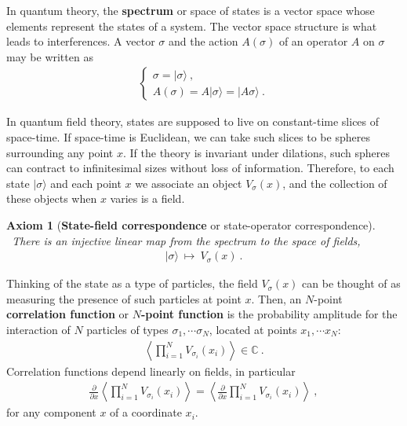\documentclass[12pt, a4paper, notitlepage, twoside]{report}
\numberwithin{equation}{section}
\theoremstyle{break}
\newtheorem{hyp}{Axiom}[chapter]
\begin{document}
In quantum theory, the \textbf{\boldmath spectrum} or space of states is a vector space whose elements represent the states of a system.
The vector space structure is what leads to interferences.
A vector $\sigma$ and the action $A(\sigma)$ of an operator $A$ on $\sigma$ may be written as 
\begin{align}
\left\{\begin{array}{l} 
 \sigma = |\sigma\rangle\ , \\ A(\sigma) = A|\sigma\rangle = |A\sigma\rangle\ .
\end{array}\right. 
\end{align}

In quantum field theory, states are supposed to live on constant-time slices of space-time. If space-time is Euclidean, we can take such slices to be spheres surrounding any point $x$. If the theory is invariant under dilations, such spheres can contract to infinitesimal sizes without loss of information. Therefore, to each state $|\sigma\rangle$ and each point $x$ we associate an object $V_\sigma(x)$, and the collection of these objects when $x$ varies is a field. 

\begin{hyp}[\textbf{\boldmath State-field correspondence} or state-operator correspondence]
~\label{ax:sfc}
 There is an injective linear map from the spectrum to the space of fields,
 \begin{align}
 |\sigma \rangle  \ \mapsto \ V_\sigma(x)\ .
\end{align}
\end{hyp} 
\noindent
Thinking of the state as a type of particles, the field $V_\sigma(x)$ can be thought of as measuring the presence of such particles at point $x$.
Then, an $N$-point \textbf{\boldmath correlation function} or \textbf{\boldmath $N$-point function} is the probability amplitude for the interaction of $N$ particles of types $\sigma_1,\cdots \sigma_N$, located at points $x_1,\cdots x_N$:
\begin{align}
\left\langle \prod_{i=1}^N V_{\sigma_i}(x_i)\right\rangle\in \mathbb{C}\ .
\label{pva}
\end{align}
Correlation functions depend linearly on fields, in particular 
\begin{align}
 \frac{\partial}{\partial x} \left\langle \prod_{i=1}^N V_{\sigma_i}(x_i)\right\rangle = \left\langle \frac{\partial}{\partial x} \prod_{i=1}^N V_{\sigma_i}(x_i)\right\rangle\ ,
\end{align}
for any component $x$ of a coordinate $x_i$. 
\end{document}

